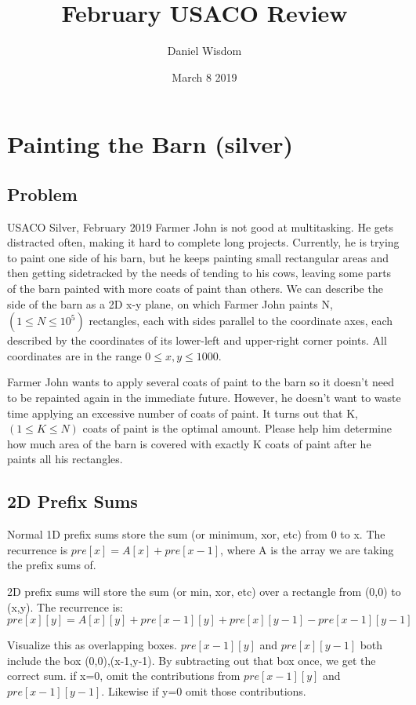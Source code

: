 \documentclass{article}
\title{February USACO Review}
\author{Daniel Wisdom}
\date{March 8 2019}
\begin{document}
\maketitle


\section {Painting the Barn (silver)}
\subsection{Problem}
USACO Silver, February 2019
Farmer John is not good at multitasking. He gets distracted often, making it hard to complete long projects. Currently, he is trying to paint one side of his barn, but he keeps painting small rectangular areas and then getting sidetracked by the needs of tending to his cows, leaving some parts of the barn painted with more coats of paint than others.
We can describe the side of the barn as a 2D x-y plane, on which Farmer John paints N,$(1\leq N\leq10^5)$ rectangles, each with sides parallel to the coordinate axes, each described by the coordinates of its lower-left and upper-right corner points. All coordinates are in the range $0\leq x,y \leq 1000$.

Farmer John wants to apply several coats of paint to the barn so it doesn't need to be repainted again in the immediate future. However, he doesn't want to waste time applying an excessive number of coats of paint. It turns out that K,$(1\leq K\leq N)$ coats of paint is the optimal amount. Please help him determine how much area of the barn is covered with exactly K coats of paint after he paints all his rectangles.

\subsection{2D Prefix Sums}
Normal 1D prefix sums store the sum (or minimum, xor, etc) from 0 to x. The recurrence is $pre[x]=A[x]+pre[x-1]$, where A is the array we are taking the prefix sums of.

2D prefix sums will store the sum (or min, xor, etc) over a rectangle from (0,0) to (x,y). The recurrence is:
\[pre[x][y] = A[x][y] + pre[x-1][y] + pre[x][y-1] - pre[x-1][y-1]\]

Visualize this as overlapping boxes. $pre[x-1][y]$ and $pre[x][y-1]$ both include the box (0,0),(x-1,y-1). By subtracting out that box once, we get the correct sum. if x=0, omit the contributions from $pre[x-1][y]$ and $pre[x-1][y-1]$. Likewise if y=0 omit those contributions.
\end{document}
